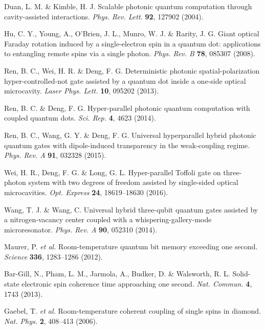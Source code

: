 \documentclass[showpacs,preprintnumbers,showkeys,amsmath,amssymb]{revtex4}%
\begin{document}
\begin{thebibliography}{61}

 Duan, L. M. \& Kimble, H. J. Scalable photonic quantum computation through cavity-assisted interactions.  \emph{Phys. Rev. Lett.} \textbf{92}, 127902 (2004).

 Hu, C. Y., Young, A., O'Brien, J. L., Munro, W. J. \& Rarity, J. G. Giant optical Faraday rotation induced by a single-electron spin in a quantum dot: applications to entangling remote spins via a single photon. \emph{Phys. Rev. B} \textbf{78}, 085307 (2008).

Ren, B. C., Wei,  H. R. \& Deng, F. G. Deterministic photonic spatial-polarization hyper-controlled-not gate assisted
by a quantum dot inside a one-side optical microcavity. \emph{Laser Phys. Lett.} \textbf{10}, 095202 (2013).

Ren, B. C. \& Deng, F. G. Hyper-parallel photonic quantum computation with coupled quantum dots. \emph{Sci. Rep.}
\textbf{4}, 4623 (2014).

Ren, B. C., Wang, G. Y. \& Deng, F. G. Universal hyperparallel hybrid photonic quantum gates with dipole-induced transparency in the weak-coupling regime. \emph{Phys. Rev. A} \textbf{91}, 032328 (2015).

Wei, H. R., Deng, F. G. \& Long, G. L.  Hyper-parallel Toffoli gate on three-photon system with two degrees of freedom assisted by single-sided optical microcavities.  \emph{Opt. Express} \textbf{24}, 18619--18630 (2016).


 Wang, T. J. \& Wang, C. Universal hybrid three-qubit quantum gates assisted by a nitrogen-vacancy center coupled with a whispering-gallery-mode microresonator. \emph{Phys. Rev. A} \textbf{90}, 052310 (2014).





 Maurer, P. \emph{et al.} Room-temperature quantum bit memory exceeding one second. \emph{Science} \textbf{336}, 1283--1286 (2012).

 Bar-Gill, N., Pham, L. M., Jarmola, A., Budker, D. \& Walsworth, R. L. Solid-state electronic spin coherence time approaching one second. \emph{Nat. Commun.} \textbf{4}, 1743 (2013). %

Gaebel, T. \emph{et al.} Room-temperature coherent coupling of single spins in diamond. \emph{Nat. Phys.} \textbf{2}, 408--413 (2006).


\end{thebibliography}
\end{document}
